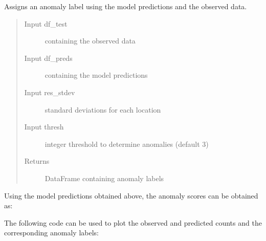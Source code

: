 \documentclass[letterpaper,10pt,english]{sphinxmanual}
\begin{document}
\begin{fulllineitems}
\label{\detokenize{manual:dnspredict.detectAnomalies}}
Assigns an anomaly label using the model predictions and the observed data.
\begin{quote}\begin{description}
\item[{Input df\_test}] \leavevmode
{} containing the observed data

\item[{Input df\_preds}] \leavevmode
{} containing the model predictions

\item[{Input res\_stdev}] \leavevmode
standard deviations for each location

\item[{Input thresh}] \leavevmode
integer threshold to determine anomalies (default 3)

\item[{Returns}] \leavevmode
DataFrame containing anomaly labels

\end{description}\end{quote}

\end{fulllineitems}


Using the model predictions obtained above, the anomaly scores can be obtained as:

\begin{sphinxVerbatim}[commandchars=\\\{\}]
  \PYG{p}{[}\PYG{p}{]}
\end{sphinxVerbatim}

The following code can be used to plot the observed and predicted counts and the corresponding anomaly labels:
\end{document}
